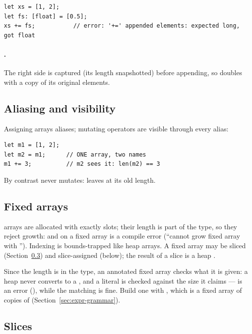 \begin{lstlisting}
let xs = [1, 2];
let fs: [float] = [0.5];
xs += fs;           // error: '+=' appended elements: expected long, got float
\end{lstlisting}

\paragraph{.} The right side is captured (its length snapshotted)
before appending, so  doubles  with a copy of its
original elements.

\subsection{Aliasing and visibility}
\label{sec:array-aliasing}

Assigning arrays aliases; mutating operators are visible through every
alias:

\begin{lstlisting}
let m1 = [1, 2];
let m2 = m1;      // ONE array, two names
m1 += 3;          // m2 sees it: len(m2) == 3
\end{lstlisting}

\noindent By contrast \ic{+} never mutates: 
leaves  at its old length.

\subsection{Fixed arrays}

\ic{[T; N]} arrays are allocated with exactly  slots; their length
is part of the type, so they reject growth: \ic{+=} and \ic{*=} on a
fixed array is a compile error (``cannot grow fixed array \ic{[long; 3]}
with ''). Indexing is bounds-trapped like heap arrays. A fixed
array may be sliced (Section~\ref{sec:slices}) and slice-assigned
(below); the result of a slice is a heap \ic{[T]}.

Since the length is in the type, an annotated fixed array checks what it
is given: a heap \ic{[T]} never converts to a \ic{[T; N]}, and a literal
is checked against the size it claims --- 
is an error (), while the matching
\ic{[long; 2]} is fine. Build one with \ic{[v; n]}, which is a fixed array
of  copies of  (Section~\ref{sec:expr-grammar}).

\subsection{Slices}
\label{sec:slices}

